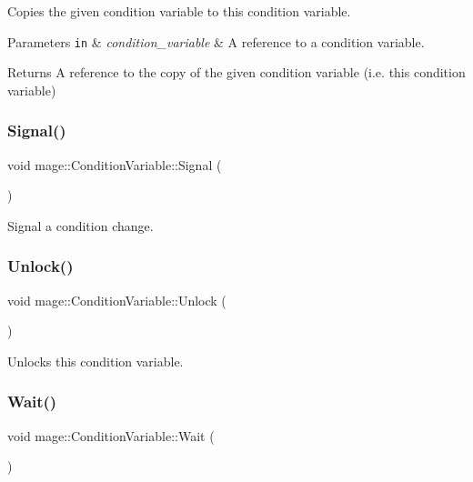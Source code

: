 Copies the given condition variable to this condition variable.


\begin{DoxyParams}[1]{Parameters}
\mbox{\tt in}  & {\em condition\+\_\+variable} & A reference to a condition variable. \\
\hline
\end{DoxyParams}
\begin{DoxyReturn}{Returns}
A reference to the copy of the given condition variable (i.\+e. this condition variable) 
\end{DoxyReturn}
\hypertarget{classmage_1_1_condition_variable_a09e52f0d51c10ee565a895d2444175d9}{}\label{classmage_1_1_condition_variable_a09e52f0d51c10ee565a895d2444175d9} 
\subsubsection{\texorpdfstring{Signal()}{Signal()}}
{\footnotesize\ttfamily void mage\+::\+Condition\+Variable\+::\+Signal (\begin{DoxyParamCaption}{ }\end{DoxyParamCaption})}

Signal a condition change. \hypertarget{classmage_1_1_condition_variable_a3b3fe63417b7d7adedc9fe015fc7feea}{}\label{classmage_1_1_condition_variable_a3b3fe63417b7d7adedc9fe015fc7feea} 
\subsubsection{\texorpdfstring{Unlock()}{Unlock()}}
{\footnotesize\ttfamily void mage\+::\+Condition\+Variable\+::\+Unlock (\begin{DoxyParamCaption}{ }\end{DoxyParamCaption})}

Unlocks this condition variable. \hypertarget{classmage_1_1_condition_variable_abc279c54285145d981f409c2d110c85a}{}\label{classmage_1_1_condition_variable_abc279c54285145d981f409c2d110c85a} 
\subsubsection{\texorpdfstring{Wait()}{Wait()}}
{\footnotesize\ttfamily void mage\+::\+Condition\+Variable\+::\+Wait (\begin{DoxyParamCaption}{ }\end{DoxyParamCaption})}

